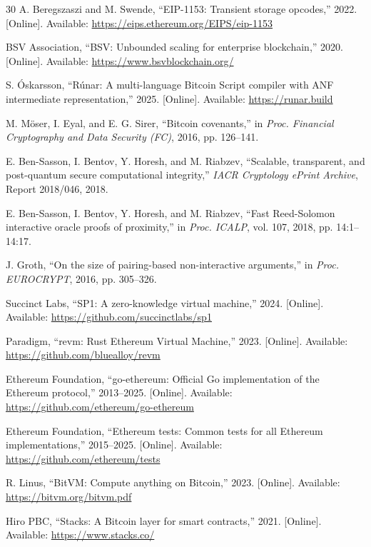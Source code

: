 \documentclass[11pt,twocolumn]{article}
\begin{document}
\begin{thebibliography}{30}
A. Beregszaszi and M. Swende, ``EIP-1153: Transient storage opcodes,'' 2022. [Online]. Available: \url{https://eips.ethereum.org/EIPS/eip-1153}

BSV Association, ``BSV: Unbounded scaling for enterprise blockchain,'' 2020. [Online]. Available: \url{https://www.bsvblockchain.org/}

S. \'{O}skarsson, ``R\'{u}nar: A multi-language Bitcoin Script compiler with ANF intermediate representation,'' 2025. [Online]. Available: \url{https://runar.build}

M. M\"{o}ser, I. Eyal, and E. G. Sirer, ``Bitcoin covenants,'' in \textit{Proc. Financial Cryptography and Data Security (FC)}, 2016, pp. 126--141.

E. Ben-Sasson, I. Bentov, Y. Horesh, and M. Riabzev, ``Scalable, transparent, and post-quantum secure computational integrity,'' \textit{IACR Cryptology ePrint Archive}, Report 2018/046, 2018.

E. Ben-Sasson, I. Bentov, Y. Horesh, and M. Riabzev, ``Fast Reed-Solomon interactive oracle proofs of proximity,'' in \textit{Proc. ICALP}, vol. 107, 2018, pp. 14:1--14:17.

J. Groth, ``On the size of pairing-based non-interactive arguments,'' in \textit{Proc. EUROCRYPT}, 2016, pp. 305--326.

Succinct Labs, ``SP1: A zero-knowledge virtual machine,'' 2024. [Online]. Available: \url{https://github.com/succinctlabs/sp1}

Paradigm, ``revm: Rust Ethereum Virtual Machine,'' 2023. [Online]. Available: \url{https://github.com/bluealloy/revm}

Ethereum Foundation, ``go-ethereum: Official Go implementation of the Ethereum protocol,'' 2013--2025. [Online]. Available: \url{https://github.com/ethereum/go-ethereum}

Ethereum Foundation, ``Ethereum tests: Common tests for all Ethereum implementations,'' 2015--2025. [Online]. Available: \url{https://github.com/ethereum/tests}

R. Linus, ``BitVM: Compute anything on Bitcoin,'' 2023. [Online]. Available: \url{https://bitvm.org/bitvm.pdf}

Hiro PBC, ``Stacks: A Bitcoin layer for smart contracts,'' 2021. [Online]. Available: \url{https://www.stacks.co/}


\end{thebibliography}
\end{document}
